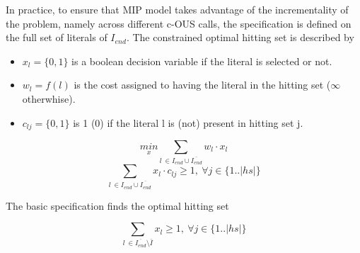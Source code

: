 \documentclass{article}
\newcommand\Iend{\ensuremath{I_\mathit{end} }\xspace}
\begin{document}
In practice, to ensure that MIP model takes advantage of the incrementality of the problem, namely across different c-OUS calls, the specification is defined on the full set of literals of $\Iend$.
The constrained optimal hitting set is described by
\begin{itemize}
  \item $x_l = \{0, 1\} $ is a boolean decision variable if the literal is selected or not.
  \item $w_l = f(l)$ is the cost assigned to having the literal in the hitting set ($\infty$ otherwhise).
  \item $c_{lj} = \{0, 1\}$ is 1 (0) if the literal l is (not) present in hitting set j.
\end{itemize}

\begin{equation} \label{eq:ILP:objective}
  \underset{x}{min} \sum_{ l\  \in  \Iend \cup \overline{\Iend}} w_l \cdot x_l
\end{equation}
\begin{equation} \label{eq:ILP:hittingset}
  \sum_{ l\  \in  \Iend \cup \overline{\Iend}} x_l \cdot c_{lj} \geq 1, \  \forall j \in \{1..|hs|\}
\end{equation}

The basic specification finds the optimal hitting set 


\begin{equation} \label{eq:ILP:hittingset}
  \sum_{ l\  \in \overline{\Iend} \setminus \bar{I}} x_l \geq 1, \  \forall j \in \{1..|hs|\}
\end{equation}

\end{document}

